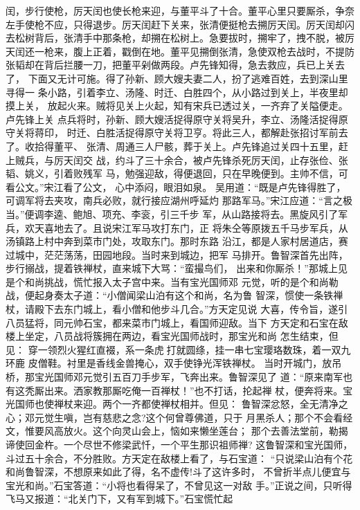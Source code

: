 闰，步行使枪，厉天闰也使长枪来迎，与董平斗了十合。董平心里只要厮杀，争奈
左手使枪不应，只得退步。厉天闰赶下关来，张清便挺枪去搠厉天闰。厉天闰却闪
去松树背后，张清手中那条枪，却搠在松树上。急要拔时，搠牢了，拽不脱，被厉
天闰还一枪来，腹上正着，戳倒在地。董平见搠倒张清，急使双枪去战时，不提防
张韬却在背后拦腰一刀，把董平剁做两段。卢先锋知得，急去救应，兵已上关去了，
下面又无计可施。得了孙新、顾大嫂夫妻二人，扮了逃难百姓，去到深山里寻得一
条小路，引着李立、汤隆、时迁、白胜四个，从小路过到关上，半夜里却摸上关，
放起火来。贼将见关上火起，知有宋兵已透过关，一齐弃了关隘便走。卢先锋上关
点兵将时，孙新、顾大嫂活捉得原守关将吴升，李立、汤隆活捉得原守关将蒋印，
时迁、白胜活捉得原守关将卫亨。将此三人，都解赴张招讨军前去了。收拾得董平、
张清、周通三人尸骸，葬于关上。卢先锋追过关四十五里，赶上贼兵，与厉天闰交
战，约斗了三十余合，被卢先锋杀死厉天闰，止存张俭、张韬、姚义，引着败残军
马，勉强迎敌，得便退回，只在早晚便到。主帅不信，可看公文。”宋江看了公文，
心中添闷，眼泪如泉。
吴用道：“既是卢先锋得胜了，可调军将去夹攻，南兵必败，就行接应湖州呼延灼
那路军马。”宋江应道：“言之极当。”便调李逵、鲍旭、项充、李衮，引三千步
军，从山路接将去。黑旋风引了军兵，欢天喜地去了。且说宋江军马攻打东门，正
将朱仝等原拨五千马步军兵，从汤镇路上村中奔到菜市门处，攻取东门。那时东路
沿江，都是人家村居道店，赛过城中，茫茫荡荡，田园地段。当时来到城边，把军
马排开。鲁智深首先出阵，步行搦战，提着铁禅杖，直来城下大骂：“蛮撮鸟们，
出来和你厮杀！”那城上见是个和尚挑战，慌忙报入太子宫中来。当有宝光国师邓
元觉，听的是个和尚勒战，便起身奏太子道：“小僧闻梁山泊有这个和尚，名为鲁
智深，惯使一条铁禅杖，请殿下去东门城上，看小僧和他步斗几合。”方天定见说
大喜，传令旨，遂引八员猛将，同元帅石宝，都来菜市门城上，看国师迎敌。当下
方天定和石宝在敌楼上坐定，八员战将簇拥在两边，看宝光国师战时，那宝光和尚
怎生结束，但见：
穿一领烈火猩红直裰，系一条虎打就圆绦，挂一串七宝璎珞数珠，着一双九环鹿
皮僧鞋。衬里是香线金兽掩心，双手使铮光浑铁禅杖。
当时开城门，放吊桥，那宝光国师邓元觉引五百刀手步军，飞奔出来。鲁智深见了
道：“原来南军也有这秃厮出来。洒家教那厮吃俺一百禅杖！”也不打话，抡起禅
杖，便奔将来。宝光国师也使禅杖来迎。两个一齐都使禅杖相并。但见：
鲁智深忿怒，全无清净之心；邓元觉生嗔，岂有慈悲之念?这个何曾尊佛道，只于
月黑杀人；那个不会看经文，惟要风高放火。这个向灵山会上，恼如来懒坐莲台；
那个去善法堂前，勒揭谛使回金杵。一个尽世不修梁武忏，一个平生那识祖师禅?
这鲁智深和宝光国师，斗过五十余合，不分胜败。方天定在敌楼上看了，与石宝道：
“只说梁山泊有个花和尚鲁智深，不想原来如此了得，名不虚传!斗了这许多时，
不曾折半点儿便宜与宝光和尚。”石宝答道：“小将也看得呆了，不曾见这一对敌
手。”正说之间，只听得飞马又报道：“北关门下，又有军到城下。”石宝慌忙起
